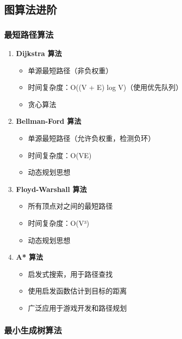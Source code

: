 \subsection{图算法进阶}

\subsubsection{最短路径算法}

\begin{enumerate}
  \item \textbf{Dijkstra 算法}
    \begin{itemize}
      \item 单源最短路径（非负权重）
      \item 时间复杂度：O((V + E) log V)（使用优先队列）
      \item 贪心算法
    \end{itemize}

  \item \textbf{Bellman-Ford 算法}
    \begin{itemize}
      \item 单源最短路径（允许负权重，检测负环）
      \item 时间复杂度：O(VE)
      \item 动态规划思想
    \end{itemize}

  \item \textbf{Floyd-Warshall 算法}
    \begin{itemize}
      \item 所有顶点对之间的最短路径
      \item 时间复杂度：O(V³)
      \item 动态规划思想
    \end{itemize}

  \item \textbf{A* 算法}
    \begin{itemize}
      \item 启发式搜索，用于路径查找
      \item 使用启发函数估计到目标的距离
      \item 广泛应用于游戏开发和路径规划
    \end{itemize}
\end{enumerate}

\subsubsection{最小生成树算法}

